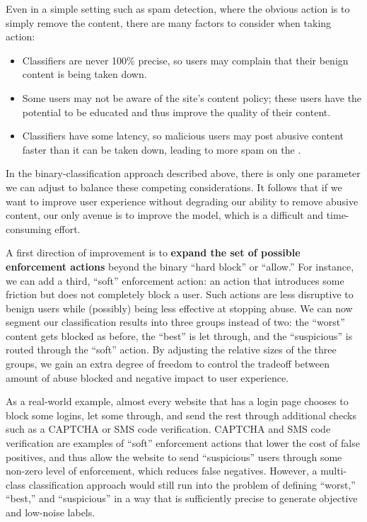 Even in a simple setting such as spam detection, where the obvious action is to simply remove the content, there are many factors to consider when taking action:
\begin{itemize}
\squeezelist
    \item Classifiers are never 100\% precise, so users may complain that their benign content is being taken down.
    \item Some users may not be aware of the site's content policy; these users have the potential to be educated and thus improve the quality of their content.
    \item Classifiers have some latency, so malicious users may post abusive content faster than it can be taken down, leading to more spam on the \osn.
\end{itemize}
In the binary-classification approach described above, there is only one parameter we can adjust to balance these competing considerations. It follows that if we want to improve user experience without degrading our ability to remove abusive content, our only avenue is to improve the model, which is a difficult and time-consuming effort.

A first direction of improvement is to {\bf expand the set of possible enforcement actions} beyond the binary ``hard block'' or ``allow.'' For instance, we can add a third, ``soft'' enforcement action: an action that introduces some friction but does not completely block a user. Such actions are less disruptive to benign users while (possibly) being less effective at stopping abuse. We can now segment our classification results into three groups instead of two: the ``worst'' content gets blocked as before, the ``best'' is let through, and the ``suspicious'' is routed through the ``soft'' action. By adjusting the relative sizes of the three groups, we gain an extra degree of freedom to control the tradeoff between amount of abuse blocked and negative impact to user experience.

As a real-world example, almost every website that has a login page chooses to block some logins, let some through, and send the rest through additional checks such as a CAPTCHA or SMS code verification. CAPTCHA and SMS code verification are examples of ``soft'' enforcement actions that lower the cost of false positives, and thus allow the website to send ``suspicious'' users through some non-zero level of enforcement, which reduces false negatives. However, a multi-class classification approach would still run into the problem of defining ``worst,'' ``best,'' and ``suspicious'' in a way that is sufficiently precise to generate objective and low-noise labels.

